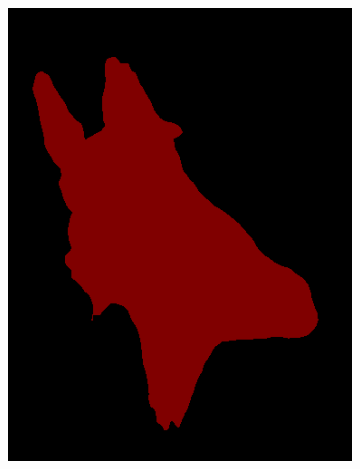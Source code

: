 \documentclass{article} %
\begin{document}
\begin{figure}[t]
\begin{subfigure}[b]{0.19\linewidth}
    \includegraphics[width=\textwidth]{figs/ab/fcn/2007_002619}
  \end{subfigure}
  \begin{subfigure}[b]{0.19\linewidth}

\end{subfigure}
\end{figure}
\end{document}
